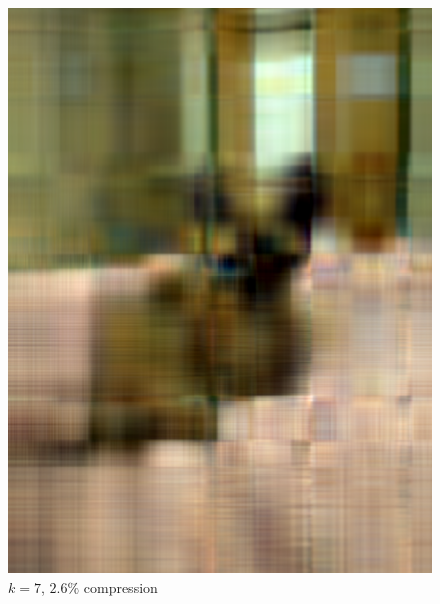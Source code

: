 \begin{figure}[H]
\begin{minipage}[b]{0.4\textwidth}
    \includegraphics[width=\textwidth]{images/compressed_cat_7.png}
    \caption{$k = 7$, $2.6\%$ compression}
  \end{minipage}
\end{figure}
